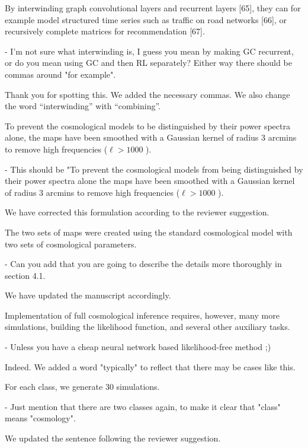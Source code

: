 \documentclass[12pt,a4paper]{article}
\newcommand{\nati}[1]{{\color[rgb]{.1,.6,.1}{NP: #1}}}
\newcommand{\todo}[1]{{\color[rgb]{.6,.1,.6}{TODO: #1}}}
\newcommand{\1}{\b{1}}              %
\newcommand{\0}{\b{0}}              %
\begin{document}
\begin{mdframed}[style=comment]
By interwinding graph convolutional layers and recurrent layers [65], they can for example model structured time series such as traffic on road networks [66], or recursively complete matrices for recommendation [67].

- I'm not sure what interwinding is, I guess you mean by making GC recurrent, or do you mean using GC and then RL separately? Either way there should be commas around "for example".
\end{mdframed}
Thank you for spotting this. We added the necessary commas. We also change the word ``interwinding'' with ``combining''.


\begin{mdframed}[style=comment]
To prevent the cosmological models to be distinguished by their power spectra alone, the maps have been smoothed with a Gaussian kernel of radius 3 arcmins to remove high frequencies ($\ell> 1000$ ).

- This should be "To prevent the cosmological models from being distinguished by their power spectra alone the maps have been smoothed with a Gaussian kernel of radius 3 arcmins to remove high frequencies ($\ell> 1000$ ).
\end{mdframed}
We have corrected this formulation according to the reviewer suggestion.

\begin{mdframed}[style=comment]
The two sets of maps were created using the standard cosmological model with two sets of cosmological parameters.

- Can you add that you are going to describe the details more thoroughly in section 4.1.
\end{mdframed}
We have updated the manuscript accordingly.

\begin{mdframed}[style=comment]
Implementation of full cosmological inference requires, however, many more simulations, building the likelihood function, and several other auxiliary tasks.

- Unless you have a cheap neural network based likelihood-free method ;)
\end{mdframed}
Indeed. We added a word "typically" to reflect that there may be cases like this.

\begin{mdframed}[style=comment]
For each class, we generate 30 simulations.

- Just mention that there are two classes again, to make it clear that "class" means "cosmology".
\end{mdframed}
We updated the sentence following the reviewer suggestion.
\nati{@Tomek, do you think it is fine that we do not say that class==comoslogy? It think so.}
\end{document}
